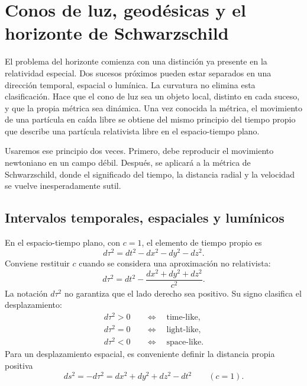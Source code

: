 \chapter{Conos de luz, geodésicas y el horizonte de Schwarzschild}

El problema del horizonte comienza con una distinción ya presente en la relatividad especial. Dos sucesos próximos pueden estar separados en una dirección temporal, espacial o lumínica. La curvatura no elimina esta clasificación. Hace que el cono de luz sea un objeto local, distinto en cada suceso, y que la propia métrica sea dinámica. Una vez conocida la métrica, el movimiento de una partícula en caída libre se obtiene del mismo principio del tiempo propio que describe una partícula relativista libre en el espacio-tiempo plano.

Usaremos ese principio dos veces. Primero, debe reproducir el movimiento newtoniano en un campo débil. Después, se aplicará a la métrica de Schwarzschild, donde el significado del tiempo, la distancia radial y la velocidad se vuelve inesperadamente sutil.

\section{Intervalos temporales, espaciales y lumínicos}

En el espacio-tiempo plano, con \(c=1\), el elemento de tiempo propio es
\begin{equation}
d\tau^2=dt^2-dx^2-dy^2-dz^2.
\label{eq:l5-minkowski-proper-time}
\end{equation}
Conviene restituir \(c\) cuando se considera una aproximación no relativista:
\begin{equation}
d\tau^2
=dt^2-\frac{dx^2+dy^2+dz^2}{c^2}.
\label{eq:l5-minkowski-c}
\end{equation}
La notación \(d\tau^2\) no garantiza que el lado derecho sea positivo. Su signo clasifica el desplazamiento:
\begin{align}
d\tau^2>0
&\quad\Longleftrightarrow\quad \text{time-like},\\
d\tau^2=0
&\quad\Longleftrightarrow\quad \text{light-like},\\
d\tau^2<0
&\quad\Longleftrightarrow\quad \text{space-like}.
\end{align}
Para un desplazamiento espacial, es conveniente definir la distancia propia positiva
\begin{equation}
ds^2=-d\tau^2
=dx^2+dy^2+dz^2-dt^2
\qquad(c=1).
\label{eq:l5-proper-distance}
\end{equation}

